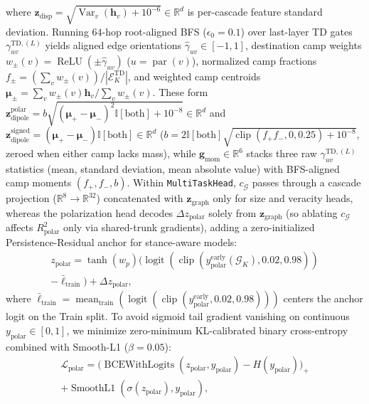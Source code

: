 \documentclass[conference]{IEEEtran}
\begin{document}
where $\mathbf{z}_{\text{disp}} = \sqrt{\operatorname{Var}_v(\mathbf{h}_v) + 10^{-6}} \in \mathbb{R}^{d}$ is per-cascade feature standard deviation. Running $64$-hop root-aligned BFS ($\epsilon_0 = 0.1$) over last-layer TD gates $\gamma_{uv}^{\text{TD},(L)}$ yields aligned edge orientations $\hat{\gamma}_{uv} \in [-1, 1]$, destination camp weights $w_\pm(v) = \operatorname{ReLU}(\pm\hat{\gamma}_{uv})$ ($u = \operatorname{par}(v)$), normalized camp fractions $f_\pm = (\sum_{v} w_\pm(v))/|\mathcal{E}_K^{\text{TD}}|$, and weighted camp centroids $\boldsymbol{\mu}_\pm = \sum_v w_\pm(v)\mathbf{h}_v / \sum_v w_\pm(v)$. These form $\mathbf{z}_{\text{dipole}}^{\text{polar}} = b\sqrt{(\boldsymbol{\mu}_+ - \boldsymbol{\mu}_-)^2 \mathbb{I}[\text{both}] + 10^{-8}} \in \mathbb{R}^{d}$ and $\mathbf{z}_{\text{dipole}}^{\text{signed}} = (\boldsymbol{\mu}_+ - \boldsymbol{\mu}_-)\mathbb{I}[\text{both}] \in \mathbb{R}^{d}$ ($b = 2\mathbb{I}[\text{both}]\sqrt{\operatorname{clip}(f_+ f_-, 0, 0.25) + 10^{-8}}$, zeroed when either camp lacks mass), while $\mathbf{g}_{\text{mom}} \in \mathbb{R}^6$ stacks three raw $\gamma_{uv}^{\text{TD},(L)}$ statistics (mean, standard deviation, mean absolute value) with BFS-aligned camp moments $(f_+, f_-, b)$. Within \texttt{MultiTaskHead}, $c_{\mathcal{G}}$ passes through a cascade projection ($\mathbb{R}^8 \to \mathbb{R}^{32}$) concatenated with $\mathbf{z}_{\text{graph}}$ only for size and veracity heads, whereas the polarization head decodes $\Delta z_{\text{polar}}$ solely from $\mathbf{z}_{\text{graph}}$ (so ablating $c_{\mathcal{G}}$ affects $R^2_{\text{polar}}$ only via shared-trunk gradients), adding a zero-initialized Persistence-Residual anchor for stance-aware models:
\begin{multline}
z_{\text{polar}} = \tanh(w_p)\bigl(\operatorname{logit}(\operatorname{clip}(y_{\text{polar}}^{\text{early}}(\mathcal{G}_K), 0.02, 0.98)) \\
- \bar{\ell}_{\text{train}}\bigr) + \Delta z_{\text{polar}},
\end{multline}
where $\bar{\ell}_{\text{train}} = \operatorname{mean}_{\text{train}}(\operatorname{logit}(\operatorname{clip}(y_{\text{polar}}^{\text{early}}, 0.02, 0.98)))$ centers the anchor logit on the Train split. To avoid sigmoid tail gradient vanishing on continuous $y_{\text{polar}} \in [0, 1]$, we minimize zero-minimum KL-calibrated binary cross-entropy combined with Smooth-L1 ($\beta = 0.05$):
\begin{multline}
\mathcal{L}_{\text{polar}} = \bigl(\operatorname{BCEWithLogits}(z_{\text{polar}}, y_{\text{polar}}) - H(y_{\text{polar}})\bigr)_+ \\
+ \operatorname{SmoothL1}(\sigma(z_{\text{polar}}), y_{\text{polar}}),
\end{multline}
\end{document}
